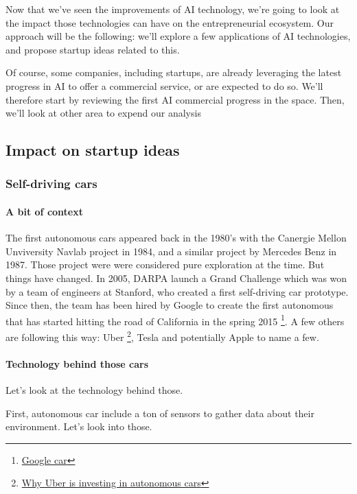 \documentclass[12pt]{article}
\begin{document}
Now that we've seen the improvements of AI technology, we're going to look at
the impact those technologies can have on the entrepreneurial ecosystem.
Our approach will be the following: we'll explore a few applications of AI
technologies, and propose startup ideas related to this.

Of course, some companies, including startups, are already leveraging the latest
progress in AI to offer a commercial service, or are expected to do so.
We'll therefore start by reviewing the first AI commercial progress in the
space. Then, we'll look at other area to expend our analysis

\subsection{Impact on startup ideas}

\subsubsection{Self-driving cars}

\paragraph{A bit of context}

The first autonomous cars appeared back in the 1980's with the Canergie Mellon
Unviversity Navlab project in 1984, and a similar project by Mercedes Benz in
1987. Those project were were considered pure exploration at the time.
But things have changed. In 2005, DARPA launch a Grand Challenge which was won
by a team of engineers at Stanford, who created a first self-driving car
prototype. Since then, the team has been hired by Google to create the first
autonomous that has started hitting the road of California in the spring 2015 \footnote{\href{http://www.google.com/selfdrivingcar/}
{Google car}}.
A few others are following this way: Uber \footnote{\href{http://www.businessinsider.com/why-uber-is-investing-in-autonomous-cars-2015-8?IR=T}
{Why Uber is investing in autonomous cars}}, Tesla and potentially Apple to name
a few.

\paragraph{Technology behind those cars}

Let's look at the technology behind those.

First, autonomous car include a ton of sensors to gather data about their
environment. Let's look into those.
\end{document}
